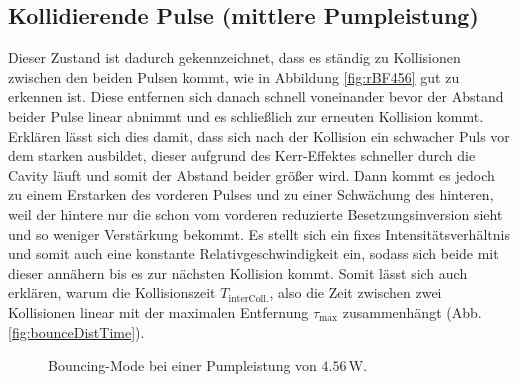 \documentclass[bachelor,       %
               twoside,        %
               BCOR10mm,       %
               english,ngerman, %
               ]{GAUBM}
\begin{document}
\subsection{Kollidierende Pulse (mittlere Pumpleistung)}
Dieser Zustand ist dadurch gekennzeichnet, dass es ständig zu Kollisionen zwischen den beiden Pulsen kommt, wie in Abbildung \ref{fig:rBF456} gut zu erkennen ist.
Diese entfernen sich danach schnell voneinander bevor der Abstand beider Pulse linear abnimmt und es schließlich zur erneuten Kollision kommt.
Erklären lässt sich dies damit, dass sich nach der Kollision ein schwacher Puls vor dem starken ausbildet, dieser aufgrund des Kerr-Effektes schneller durch die Cavity läuft und somit der Abstand beider größer wird.
Dann kommt es jedoch zu einem Erstarken des vorderen Pulses und zu einer Schwächung des hinteren, weil der hintere nur die schon vom vorderen reduzierte Besetzungsinversion sieht und so weniger Verstärkung bekommt.
Es stellt sich ein fixes Intensitätsverhältnis und somit auch eine konstante Relativgeschwindigkeit ein, sodass sich beide mit dieser annähern bis es zur nächsten Kollision kommt.
Somit lässt sich auch erklären, warum die Kollisionszeit $T_\text{interColl.}$, also die Zeit zwischen zwei Kollisionen linear mit der maximalen Entfernung $\tau_\text{max}$ zusammenhängt (Abb. \ref{fig:bounceDistTime}).

\begin{figure}[!htb]
   \centering   
   \hfill
   \caption{Bouncing-Mode bei einer Pumpleistung von $4.56\,$W.}
   \label{fig:bouncing456}
 \end{figure}
\end{document}
